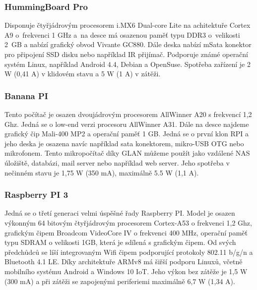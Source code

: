 \subsubsection*{HummingBoard Pro}
 Disponuje čtyřjádrovým procesorem i.MX6 Dual-core Lite na achitektuře Cortex A9 o~frekvenci 1 GHz a~na desce má osazenou paměť typu DDR3 o~velikosti 2~GB a nabízí grafický obvod Vivante GC880. Dále deska nabízí mSata konektor pro připojení SSD disku nebo například IR přijímač. Podporuje známé operační systém Linux, například Android 4.4, Debian a OpenSuse. Spotřeba zařízení je 2 W (0,41 A) v klidovém stavu a 5 W (1 A) v zátěži.

\subsubsection*{Banana PI}
Tento počítač je osazen dvoujádrovým procesorem AllWinner A20 s frekvencí 1,2 Ghz. Jedná se o low-end verzi procesoru AllWinner A31. Dále na desce najdeme grafický čip Mali-400 MP2 a operační paměť 1 GB. Jedná se o první klon RPI a jeho deska je osazena navíc například sata konektorem, mikro-USB OTG nebo mikrofonem. Tento mikropočítač díky GLAN můžeme použít jako vzdálené NAS úložiště, databázi, mail server nebo například web server. Jeho spotřeba v nečinném stavu je 1,75 W (350 mA), maximálně 5.5 W (1,1 A).

\subsubsection*{Raspberry PI 3}
Jedná se o třetí generaci velmi úspěšné řady Raspberry PI. Model je osazen výkonným 64 bitovým čtyřjádrovým procesorem Cortex-A53 o frekvenci 1,2 Ghz, grafickým čipem Broadcom VideoCore IV o frekvenci 400 MHz, operační paměť typu SDRAM o velikosti 1GB, která je sdílená s grafickým čipem. Od svých předchůdců se líší integrovaným Wifi čipem podporující protokoly 802.11 b/g/n a Bluetooth 4.1 LE. Díky architektuře ARMv8 má šiřší podporu Linuxů, včetně mobilního systému Android a Windows 10 IoT. Jeho výkon bez zátěže je 1,5 W (300 mA) a při zátěži se zapojenými periferiemi maximálně 6,7 W (1,34 A).

